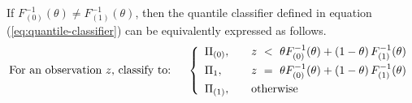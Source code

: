 \begin{lemma}
  \label{lem:decision-boundary}
  If $F_{(0)}^{-1}(\theta) \ne F_{(1)}^{-1}(\theta)$, then the quantile
  classifier defined in equation (\ref{eq:quantile-classifier}) can be
  equivalently expressed as follows.
  \begin{equation}
    \label{eq:alt-quantile-classifier}
    \text{For an observation $z$, classify to:} \hspace{5mm} \left\{ 
      \begin{array}{lcl}
        \Pi_{(0)}, & & z ~<~ \theta F_{(0)}^{-1}(\theta) +
                       (1 - \theta)\, F_{(1)}^{-1}(\theta) \\[1ex]
        \Pi_{1}, & & z ~=~ \theta F_{(0)}^{-1}(\theta) +
                       (1 - \theta)\, F_{(1)}^{-1}(\theta) \\[1ex]
        \Pi_{(1)}, & & \textup{otherwise}
      \end{array}
    \right.
  \end{equation}
\end{lemma}


